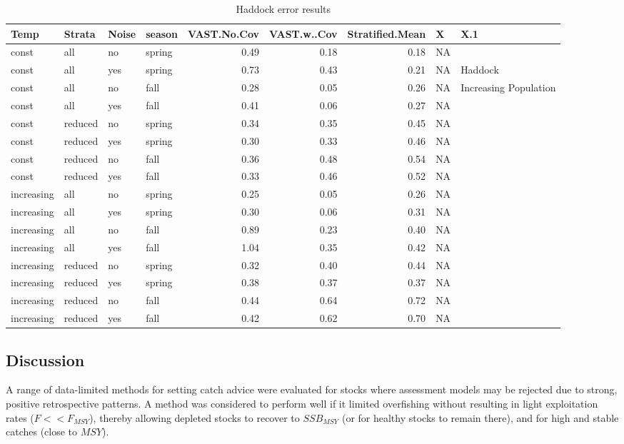 \documentclass[
]{article}
\begin{document}
\begin{table}

\caption{\label{tab:unnamed-chunk-1}Haddock error results}
\centering
\begin{tabular}[t]{l|l|l|l|r|r|r|l|l}
\hline
Temp & Strata & Noise & season & VAST.No.Cov & VAST.w..Cov & Stratified.Mean & X & X.1\\
\hline
const & all & no & spring & 0.49 & 0.18 & 0.18 & NA & \\
\hline
const & all & yes & spring & 0.73 & 0.43 & 0.21 & NA & Haddock\\
\hline
const & all & no & fall & 0.28 & 0.05 & 0.26 & NA & Increasing Population\\
\hline
const & all & yes & fall & 0.41 & 0.06 & 0.27 & NA & \\
\hline
const & reduced & no & spring & 0.34 & 0.35 & 0.45 & NA & \\
\hline
const & reduced & yes & spring & 0.30 & 0.33 & 0.46 & NA & \\
\hline
const & reduced & no & fall & 0.36 & 0.48 & 0.54 & NA & \\
\hline
const & reduced & yes & fall & 0.33 & 0.46 & 0.52 & NA & \\
\hline
increasing & all & no & spring & 0.25 & 0.05 & 0.26 & NA & \\
\hline
increasing & all & yes & spring & 0.30 & 0.06 & 0.31 & NA & \\
\hline
increasing & all & no & fall & 0.89 & 0.23 & 0.40 & NA & \\
\hline
increasing & all & yes & fall & 1.04 & 0.35 & 0.42 & NA & \\
\hline
increasing & reduced & no & spring & 0.32 & 0.40 & 0.44 & NA & \\
\hline
increasing & reduced & yes & spring & 0.38 & 0.37 & 0.37 & NA & \\
\hline
increasing & reduced & no & fall & 0.44 & 0.64 & 0.72 & NA & \\
\hline
increasing & reduced & yes & fall & 0.42 & 0.62 & 0.70 & NA & \\
\hline
\end{tabular}
\end{table}

\hypertarget{discussion}{%
\subsection{Discussion}\label{discussion}}

A range of data-limited methods for setting catch advice were evaluated for stocks where assessment models may be rejected due to strong, positive retrospective patterns. A method was considered to perform well if it limited overfishing without resulting in light exploitation rates (\(F << F_{MSY}\)), thereby allowing depleted stocks to recover to \(SSB_{MSY}\) (or for healthy stocks to remain there), and for high and stable catches (close to \(MSY\)).
\end{document}
